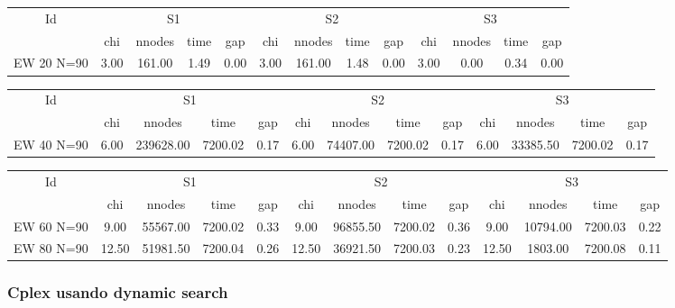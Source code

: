 \begin{sidewaystable}[h] \begin{tabular}{|c|cccc|cccc|cccc|}
\hline
\multicolumn{1}{|c|}{Id} & \multicolumn{4}{|c|}{S1} & \multicolumn{4}{|c|}{S2} & \multicolumn{4}{|c|}{S3}
\\
 & chi & nnodes & time & gap & chi & nnodes & time & gap & chi & nnodes & time & gap
\\
\hline
EW 20 N=90 & 3.00 & 161.00 & 1.49 & 0.00 & 3.00 & 161.00 & 1.48 & 0.00 & 3.00 & 0.00 & 0.34 & 0.00
\\
\hline 
 \end{tabular} 
 
 
 \begin{tabular}{|c|cccc|cccc|cccc|}
\hline
\multicolumn{1}{|c|}{Id} & \multicolumn{4}{|c|}{S1} & \multicolumn{4}{|c|}{S2} & \multicolumn{4}{|c|}{S3}
\\
 & chi & nnodes & time & gap & chi & nnodes & time & gap & chi & nnodes & time & gap
\\
\hline
EW 40 N=90 & 6.00 & 239628.00 & 7200.02 & 0.17 & 6.00 & 74407.00 & 7200.02 & 0.17 & 6.00 & 33385.50 & 7200.02 & 0.17
\\
\hline 
 \end{tabular} 
 
 \begin{tabular}{|c|cccc|cccc|cccc|}
\hline
\multicolumn{1}{|c|}{Id} & \multicolumn{4}{|c|}{S1} & \multicolumn{4}{|c|}{S2} & \multicolumn{4}{|c|}{S3}
\\
 & chi & nnodes & time & gap & chi & nnodes & time & gap & chi & nnodes & time & gap
\\
\hline
EW 60 N=90 & 9.00 & 55567.00 & 7200.02 & 0.33 & 9.00 & 96855.50 & 7200.02 & 0.36 & 9.00 & 10794.00 & 7200.03 & 0.22
\\
EW 80 N=90 & 12.50 & 51981.50 & 7200.04 & 0.26 & 12.50 & 36921.50 & 7200.03 & 0.23 & 12.50 & 1803.00 & 7200.08 & 0.11
\\
\hline 
 \end{tabular} \end{sidewaystable}

\clearpage

\subsubsection{Cplex usando dynamic search}


